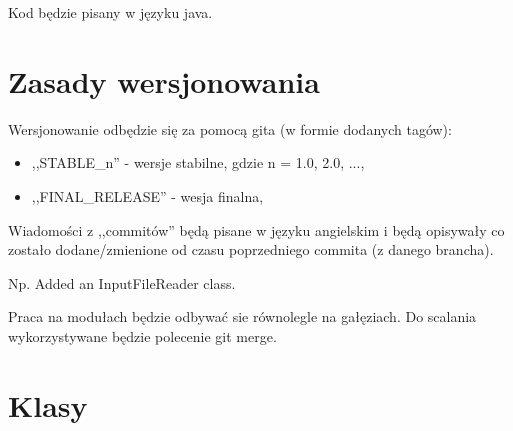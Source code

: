 \documentclass{article}
\begin{document}
Kod będzie pisany w języku java.

\section{Zasady wersjonowania}

Wersjonowanie odbędzie się za pomocą gita (w formie dodanych tagów):

\begin{itemize}
\item
,,STABLE\_n'' - wersje stabilne, gdzie n = 1.0, 2.0, ...,
\item
,,FINAL\_RELEASE'' - wesja finalna,
\end{itemize} 


Wiadomości z ,,commitów'' będą pisane w języku angielskim i będą opisywały co zostało dodane/zmienione od czasu poprzedniego commita (z danego brancha).

Np. Added an InputFileReader class.

Praca na modułach będzie odbywać sie równolegle na gałęziach. Do scalania wykorzystywane będzie polecenie git merge.


\section{Klasy}
\end{document}

